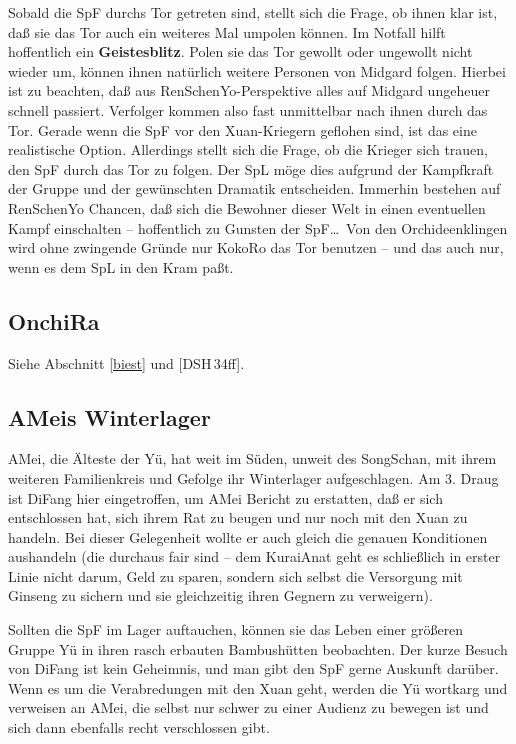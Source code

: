 \documentclass[
a4paper,
twoside,
DIV=calc,
BCOR=4mm,
fontsize=9pt,
twocolumn=on,
titlepage=on,
parskip=half
]{scrartcl}
\begin{document}
Sobald die SpF durchs Tor getreten sind, stellt sich die Frage, ob
ihnen klar ist, daß sie das Tor auch ein weiteres Mal umpolen
können. Im Notfall hilft hoffentlich ein \textbf{Geistesblitz}. Polen
sie das Tor gewollt oder ungewollt nicht wieder um, können ihnen
natürlich weitere Personen von Midgard folgen. Hierbei ist zu
beachten, daß aus RenSchenYo-Perspektive alles auf Midgard ungeheuer
schnell passiert. Verfolger kommen also fast unmittelbar nach ihnen
durch das Tor. Gerade wenn die SpF vor den Xuan-Kriegern geflohen
sind, ist das eine realistische Option. Allerdings stellt sich die
Frage, ob die Krieger sich trauen, den SpF durch das Tor zu
folgen. Der SpL möge dies aufgrund der Kampfkraft der Gruppe und der
gewünschten Dramatik entscheiden. Immerhin bestehen auf RenSchenYo
Chancen, daß sich die Bewohner dieser Welt in einen eventuellen Kampf
einschalten -- hoffentlich zu Gunsten der SpF\dots\ Von den
Orchideenklingen wird ohne zwingende Gründe nur KokoRo das Tor
benutzen -- und das auch nur, wenn es dem SpL in den Kram paßt.

\subsection{OnchiRa}

Siehe Abschnitt \ref{biest} und [DSH\,34ff].

\subsection{AMeis Winterlager}
\label{winterlager}

AMei, die Älteste der Yü, hat weit im Süden, unweit des SongSchan, mit
ihrem weiteren Familienkreis und Gefolge ihr Winterlager
aufgeschlagen. Am 3. Draug ist DiFang hier eingetroffen, um AMei
Bericht zu erstatten, daß er sich entschlossen hat, sich ihrem Rat zu
beugen und nur noch mit den Xuan zu handeln. Bei dieser Gelegenheit
wollte er auch gleich die genauen Konditionen aushandeln (die durchaus
fair sind -- dem KuraiAnat geht es schließlich in erster Linie nicht
darum, Geld zu sparen, sondern sich selbst die Versorgung mit Ginseng
zu sichern und sie gleichzeitig ihren Gegnern zu verweigern).

Sollten die SpF im Lager auftauchen, können sie das Leben einer
größeren Gruppe Yü in ihren rasch erbauten Bambushütten
beobachten. Der kurze Besuch von DiFang ist kein Geheimnis, und man
gibt den SpF gerne Auskunft darüber. Wenn es um die Verabredungen mit
den Xuan geht, werden die Yü wortkarg und verweisen an AMei, die
selbst nur schwer zu einer Audienz zu bewegen ist und sich dann
ebenfalls recht verschlossen gibt.
\end{document}

